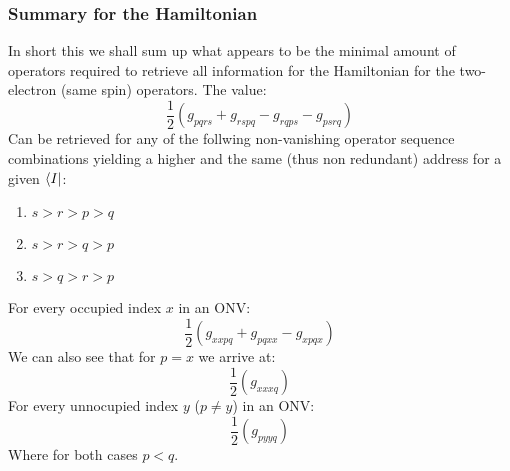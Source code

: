 \subsubsection{Summary for the Hamiltonian}
In short this we shall sum up what appears to be the minimal amount of operators required to retrieve all information for the Hamiltonian for the two-electron (same spin) operators.
The value:
\begin{equation}
  \frac{1}{2} (g_{pqrs} + g_{rspq} - g_{rqps} - g_{psrq})
\end{equation}
 Can be retrieved for any of the follwing non-vanishing operator sequence combinations yielding a higher and the same (thus non redundant) address for a given $\bra{I}$:
\begin{enumerate}
  \item $s > r > p > q$
  \item $s > r > q > p$
  \item $s > q > r > p$
\end{enumerate}
For every occupied index $x$ in an ONV:
\begin{equation}
  \frac{1}{2} (g_{xxpq} + g_{pqxx} - g_{xpqx})
\end{equation}
We can also see that for $p=x$ we arrive at:
\begin{equation}
  \frac{1}{2} (g_{xxxq})
\end{equation}
For every unnocupied index $y$ ($p \neq y$) in an ONV:
\begin{equation}
  \frac{1}{2} (g_{pyyq})
\end{equation}
Where for both cases $p<q$.
